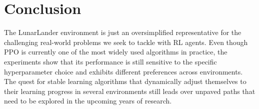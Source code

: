 \documentclass[a4paper, 11pt]{article}
\begin{document}
	\section{Conclusion}
	The LunarLander environment is just an oversimplified representative for the challenging real-world problems we seek to tackle with RL agents. 
	Even though PPO is currently one of the most widely used algorithms in practice, the experiments show that its performance is still sensitive to the specific hyperparameter choice and exhibits different preferences across environments.
	The quest for stable learning algorithms that dynamically adjust themselves to their learning progress in several environments still leads over unpaved paths that need to be explored in the upcoming years of research.
	
\end{document}
